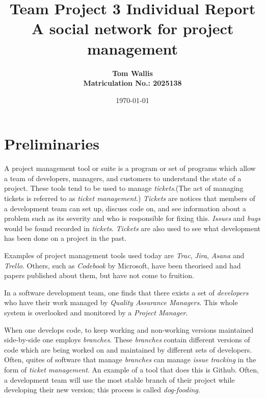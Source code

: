 \documentclass[10pt]{article}
\author{\bf Tom Wallis \\ \bf Matriculation No.: 2025138}
\date{\today}
\title{Team Project 3 Individual Report\\
A social network for project management\\ \vspace{4mm}
}
\begin{document}
\maketitle

\section{Preliminaries}\par
A project management tool or suite is a program or set of programs which allow a team of developers, managers, and customers to understand the state of a project. These tools tend to be used to manage \emph{tickets}.(The act of managing tickets is referred to as \emph{ticket management}.) \emph{Tickets} are notices that members of a development team can set up, discuss code on, and see information about a problem such as its severity and who is responsible for fixing this. \emph{Issues} and \emph{bugs} would be found recorded in \emph{tickets}. \emph{Tickets} are also used to see what development has been done on a project in the past. \par
Examples of project management tools used today are \emph{Trac}, \emph{Jira}, \emph{Asana} and \emph{Trello}. Others, such as \emph{Codebook} by Microsoft, have been theorised and had papers published about them, but have not come to fruition. \par
In a software development team, one finds that there exists a set of \emph{developers} who have their work managed by \emph{Quality Assurance Managers}. This whole system is overlooked and monitored by a \emph{Project Manager}. \par
When one develops code, to keep working and non-working versions maintained side-by-side one employs \emph{branches}. These \emph{branches} contain different versions of code which are being worked on and maintained by different sets of developers. Often, quites of software that manage \emph{branches} can manage \emph{issue tracking} in the form of \emph{ticket management}. An example of a tool that does this is Github. Often, a development team will use the most stable branch of their project while developing their new version; this process is called \emph{dog-fooding}.\par
\end{document}
